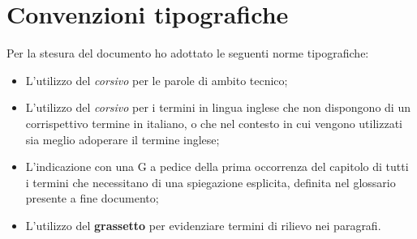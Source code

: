 
\cleardoublepage
{}
{}
\begingroup
\let\clearpage\relax
\let\cleardoublepage\relax
\let\cleardoublepage\relax

\chapter*{Convenzioni tipografiche}

Per la stesura del documento ho adottato le seguenti norme tipografiche:\\

\begin{itemize}
	\item L'utilizzo del \textit{corsivo} per le parole di ambito tecnico;
	\item L'utilizzo del \textit{corsivo} per i termini in lingua inglese che non dispongono di un corrispettivo termine in italiano, o che nel contesto in cui vengono utilizzati sia meglio adoperare il termine inglese; 
	\item L'indicazione con una G a pedice della prima occorrenza del capitolo di tutti i termini che necessitano di una spiegazione esplicita, definita nel glossario presente a fine documento;
	\item L'utilizzo del \textbf{grassetto} per evidenziare termini di rilievo nei paragrafi.
\end{itemize}



%
%

\endgroup			

\vfill

